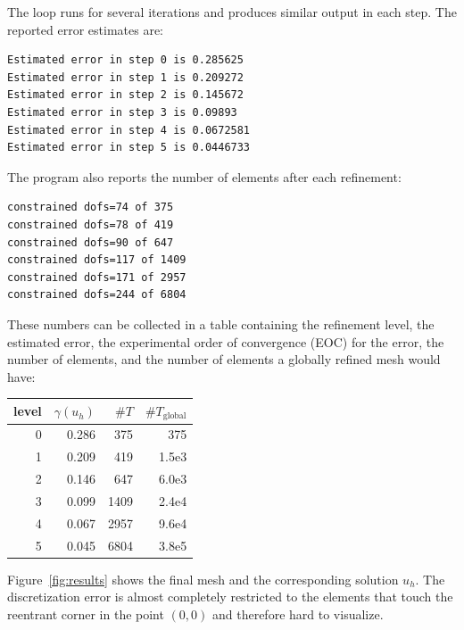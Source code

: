 \documentclass[a4paper,12pt]{article}
\begin{document}
The loop runs for several iterations and produces similar output in
each step. The reported error estimates are:
\begin{lstlisting}[basicstyle=\ttfamily\small,
frame=single,
backgroundcolor=\color{listingbg}]
Estimated error in step 0 is 0.285625
Estimated error in step 1 is 0.209272
Estimated error in step 2 is 0.145672
Estimated error in step 3 is 0.09893
Estimated error in step 4 is 0.0672581
Estimated error in step 5 is 0.0446733
\end{lstlisting}

The program also reports the number of elements after each refinement:
\begin{lstlisting}[basicstyle=\ttfamily\small,
frame=single,
backgroundcolor=\color{listingbg}]
constrained dofs=74 of 375
constrained dofs=78 of 419
constrained dofs=90 of 647
constrained dofs=117 of 1409
constrained dofs=171 of 2957
constrained dofs=244 of 6804
\end{lstlisting}

These numbers can be collected in a table containing the refinement level,
the estimated error, the experimental order of convergence (EOC) for the
error, the number of elements, and the number of elements a globally
refined mesh would have:
\begin{center}
  \begin{tabular}{rrrr}
    level & $\gamma(u_h)$ & $\#T$ & $\#T_\text{global}$ \\
    \hline
    0 & 0.286 &  375 & 375   \\
    1 & 0.209 &  419 & 1.5e3 \\
    2 & 0.146 &  647 & 6.0e3 \\
    3 & 0.099 & 1409 & 2.4e4 \\
    4 & 0.067 & 2957 & 9.6e4 \\
    5 & 0.045 & 6804 & 3.8e5 \\
\end{tabular}
\end{center}

Figure~\ref{fig:results}
shows the final mesh and the corresponding solution $u_h$. The
discretization error is almost completely restricted to the elements that
touch the reentrant corner in the point $(0,0)$ and therefore hard to
visualize.
\end{document}
